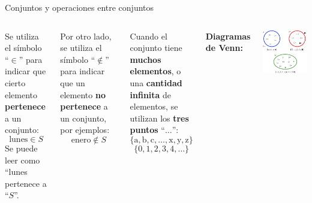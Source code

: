 \documentclass[9pt, aspectratio=169]{beamer}
\begin{document}
\begin{frame}{Conjuntos y operaciones entre conjuntos}
\begin{columns}[t]
Se utiliza el símbolo ``$\in$'' para indicar que cierto elemento \textbf{pertenece} a un conjunto:
\[ \text{lunes} \in S \]
Se puede leer como ``lunes pertenece a ``$S$''.

Por otro lado, se utiliza el símbolo ``$\notin$'' para indicar que un elemento \textbf{no pertenece} a un conjunto, por ejemplos:
\[ \text{enero} \notin S \]

Cuando el conjunto tiene \textbf{muchos elementos}, o una \textbf{cantidad infinita} de elementos, se utilizan los \textbf{tres puntos} ``$\ldots$'':
\[ \{ \text{a}, \text{b}, \text{c}, \ldots, \text{x}, \text{y}, \text{z} \} \]
\[ \{0, 1, 2, 3, 4, \ldots \} \]
\pause

\textbf{Diagramas de Venn:}
\vspace{1em}

\begin{center}
    \includegraphics[width=1.0\textwidth]{figs/fig-01.pdf}
\end{center}

\end{columns}
\end{frame}
\end{document}
